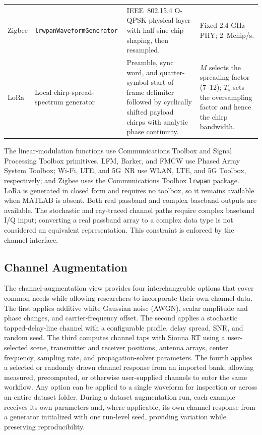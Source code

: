 \documentclass[10pt,conference,letterpaper]{IEEEtran}
\begin{document}
\begin{table}[t]
\begin{tabularx}{\textwidth}{@{}p{}p{}X p{}@{}}
Zigbee & \texttt{lrwpanWaveform}\allowbreak\texttt{Generator} & IEEE~802.15.4 O-QPSK physical layer with half-sine chip shaping, then resampled. & Fixed 2.4-GHz PHY; 2~Mchip/s. \\
LoRa & Local chirp-spread\allowbreak-spectrum generator & Preamble, sync word, and quarter-symbol start-of-frame delimiter followed by cyclically shifted payload chirps with analytic phase continuity. & $M$ selects the spreading factor (7--12); $T_s$ sets the oversampling factor and hence the chirp bandwidth. \\
\bottomrule
\end{tabularx}
\end{table}

The linear-modulation functions use Communications Toolbox and Signal Processing Toolbox primitives. LFM, Barker, and FMCW use Phased Array System Toolbox; Wi-Fi, LTE, and 5G~NR use WLAN, LTE, and 5G Toolbox, respectively; and Zigbee uses the Communications Toolbox \texttt{lrwpan} package. LoRa is generated in closed form and requires no toolbox, so it remains available when MATLAB is absent. Both real passband and complex baseband outputs are available. The stochastic and ray-traced channel paths require complex baseband I/Q input; converting a real passband array to a complex data type is not considered an equivalent representation. This constraint is enforced by the channel interface.

\subsection{Channel Augmentation}

The channel-augmentation view provides four interchangeable options that cover common needs while allowing researchers to incorporate their own channel data. The first applies additive white Gaussian noise (AWGN), scalar amplitude and phase changes, and carrier-frequency offset. The second applies a stochastic tapped-delay-line channel with a configurable profile, delay spread, SNR, and random seed. The third computes channel taps with Sionna RT using a user-selected scene, transmitter and receiver positions, antenna arrays, center frequency, sampling rate, and propagation-solver parameters. The fourth applies a selected or randomly drawn channel response from an imported bank, allowing measured, precomputed, or otherwise user-supplied channels to enter the same workflow. Any option can be applied to a single waveform for inspection or across an entire dataset folder. During a dataset augmentation run, each example receives its own parameters and, where applicable, its own channel response from a generator initialized with one run-level seed, providing variation while preserving reproducibility.
\end{document}
